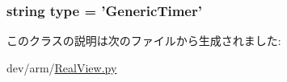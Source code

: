 \label{classRealView_1_1GenericTimer_ab737471139f5a296e5b26e8a0e1b0744}
\hypertarget{classRealView_1_1GenericTimer_acce15679d830831b0bbe8ebc2a60b2ca}{
\subsubsection[{type}]{\setlength{\rightskip}{0pt plus 5cm}string {\bf type} = '{\bf GenericTimer}'}}
\label{classRealView_1_1GenericTimer_acce15679d830831b0bbe8ebc2a60b2ca}


このクラスの説明は次のファイルから生成されました:\begin{DoxyCompactItemize}
\item 
dev/arm/\hyperlink{RealView_8py}{RealView.py}\end{DoxyCompactItemize}
